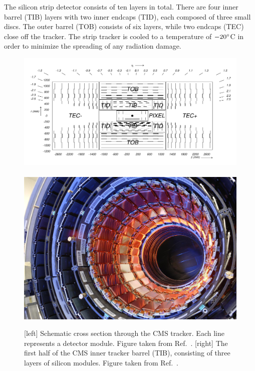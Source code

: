 The silicon strip detector consists of ten layers in total. There are four inner barrel (TIB)
layers with two inner endcaps (TID), each composed of three small discs. The outer barrel (TOB)
consists of six layers, while two endcaps (TEC) close off the tracker. The strip tracker is
cooled to a temperature of $-20^\circ$C in order to minimize the spreading of any radiation
damage.

\begin{figure}[tpb]
  \centering
  \includegraphics[height=0.165\textheight]{figures/cms/CMS_tracker_general_layout}
  ~
  \includegraphics[height=0.165\textheight]{figures/cms/cms_tracker}
  \caption{[left] Schematic cross section through the CMS tracker. Each line represents a detector
module. Figure taken from Ref.~\cite{Chatrchyan:2008aa}. 
  [right] The first half of the CMS inner tracker barrel (TIB), consisting of three
layers of silicon modules. Figure taken from Ref.~\cite{CMS_tracker}.
  \label{fig:cms_tracker}}
\end{figure}

